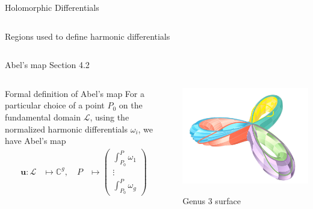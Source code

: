 \documentclass[11pt,aspectratio=169]{beamer}
\begin{document}
\begin{frame}{Holomorphic Differentials}
\begin{columns}[onlytextwidth]
\begin{column}{0.45\textwidth}
            \tiny Regions used to define harmonic differentials

            \cite{Ber06}
        \end{column}
    \end{columns}
\end{frame}

\begin{frame}{Abel's map}{\tiny \cite{Ber06} Section 4.2}
    \begin{columns}
        \begin{column}{0.55\textwidth}
            \begin{block}{Formal definition of Abel's map}
                For a particular choice of a point $P_0$ on the fundamental domain $\mathcal L$, using the normalized harmonic differentials $\omega_i$, we have Abel's map
                \begin{align*}
                    \mathbf{u} : \mathcal L & \mapsto \mathbb{C}^g , \quad P & \mapsto \begin{pmatrix} \int_{P_0}^P \omega_1 \\ \vdots \\ \int_{P_0}^P \omega_g \end{pmatrix} &
                \end{align*}
            \end{block}
        \end{column}
        \begin{column}{0.45\textwidth}
            \center

            \includegraphics[width=0.7\columnwidth]{assets/Genus3Surface.png}

            \tiny Genus 3 surface
        \end{column}
    \end{columns}


\end{frame}
\end{document}
